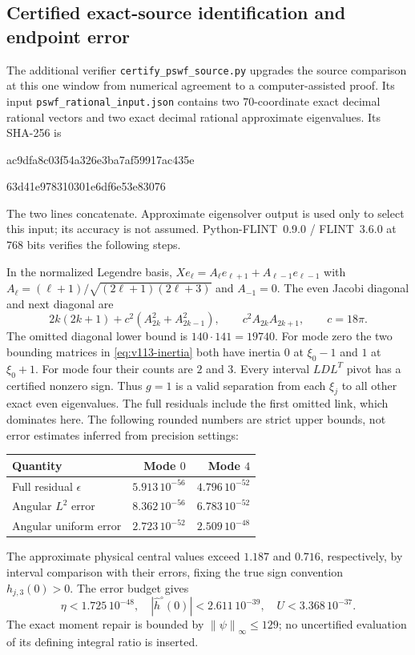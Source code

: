\documentclass[11pt]{article}
\theoremstyle{remark}
\newcommand{\norm}[1]{\left\lVert #1\right\rVert}
\begin{document}
\subsection*{Certified exact-source identification and endpoint error}
\label{app:v113-source}
The additional verifier \texttt{certify\_pswf\_source.py} upgrades the
source comparison at this one window from numerical agreement to a
computer-assisted proof. Its input \texttt{pswf\_rational\_input.json}
contains two $70$-coordinate exact decimal rational vectors and two
exact decimal rational approximate eigenvalues. Its SHA-256 is
\begin{center}\ttfamily\small
ac9dfa8c03f54a326e3ba7af59917ac435e\par
63d41e978310301e6df6e53e83076
\end{center}
The two lines concatenate. Approximate eigensolver output is used only
to select this input; its accuracy is not assumed. Python-FLINT~0.9.0 /
FLINT~3.6.0 at $768$ bits verifies the following steps.

In the normalized Legendre basis,
$Xe_\ell=A_\ell e_{\ell+1}+A_{\ell-1}e_{\ell-1}$ with
$A_\ell=(\ell+1)/\sqrt{(2\ell+1)(2\ell+3)}$ and $A_{-1}=0$.
The even Jacobi diagonal and next diagonal are
\[
 2k(2k+1)+c^2(A_{2k}^2+A_{2k-1}^2),\qquad
 c^2A_{2k}A_{2k+1},\qquad c=18\pi.
\]
The omitted diagonal lower bound is $140\cdot141=19740$.
For mode zero the two bounding matrices in
\eqref{eq:v113-inertia} both have inertia $0$ at $\xi_0-1$ and
$1$ at $\xi_0+1$. For mode four their counts are $2$ and $3$.
Every interval $LDL^T$ pivot has a certified nonzero sign.
Thus $g=1$ is a valid separation from each $\xi_j$ to all other
exact even eigenvalues. The full residuals include the first omitted
link, which dominates here. The following rounded numbers are strict
upper bounds, not error estimates inferred from precision settings:
\begin{center}
\begin{tabular}{@{}lrr@{}}
\toprule
Quantity & Mode $0$ & Mode $4$\\
\midrule
Full residual $\epsilon$ & $5.913\,10^{-56}$ & $4.796\,10^{-52}$\\
Angular $L^2$ error & $8.362\,10^{-56}$ & $6.783\,10^{-52}$\\
Angular uniform error & $2.723\,10^{-52}$ & $2.509\,10^{-48}$\\
\bottomrule
\end{tabular}
\end{center}
The approximate physical central values exceed $1.187$ and $0.716$,
respectively, by interval comparison with their errors, fixing the true
sign convention $h_{j,3}(0)>0$.
The error budget gives
\[
 \eta<1.725\,10^{-48},\quad
 |\widehat h^\circ(0)|<2.611\,10^{-39},\quad
 U<3.368\,10^{-37}.
\]
The exact moment repair is bounded by $\norm\psi_\infty\le129$;
no uncertified evaluation of its defining integral ratio is inserted.
\end{document}
